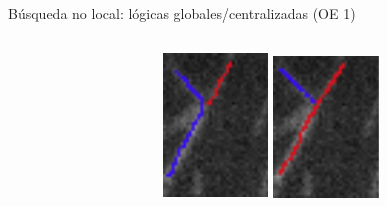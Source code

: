 \begin{frame}{B\'usqueda no local: l\'ogicas globales/centralizadas (OE 1)}
\begin{columns}
\begin{column}{0.2\textwidth}
        \end{column}
        \begin{column}{0.2\textwidth}
        \includegraphics[scale=0.5]{Pictures/NoConsenso3.png}
        \vspace{0.5cm}
        \includegraphics[scale=0.5]{Pictures/NoConsenso4.png}
        \end{column}
    \end{columns}
\end{frame}


%     


